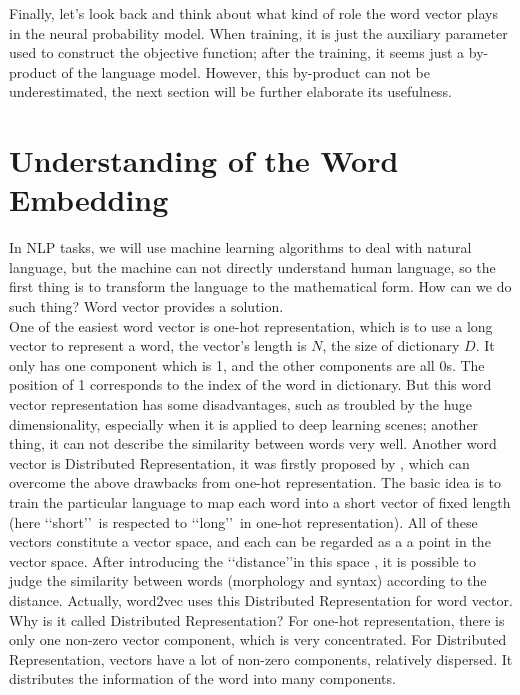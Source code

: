 Finally, let's look back and think about what kind of role the word vector plays in the neural probability model. When training, it is just the auxiliary parameter used to construct the objective function; after the training, it seems just a by-product of the language model. However, this by-product can not be underestimated, the next section will be further elaborate its usefulness.
\section{Understanding of the Word Embedding}
In NLP tasks, we will use machine learning algorithms to deal with natural language, but the machine can not directly understand human language, so the first thing is to transform the language to the mathematical form. How can we do such thing? Word vector provides a solution.\\

One of the easiest word vector is one-hot representation, which is to use a long vector to represent a word, the vector's length is  $N$, the size of dictionary $D$. It only has one component which is 1, and the other components are all 0s. The position of 1 corresponds to the index of the word in dictionary. But this word vector representation has some disadvantages, such as troubled by the huge dimensionality, especially when it is applied to deep learning scenes; another thing, it can not describe the similarity between words very well. Another word vector is Distributed Representation, it was firstly proposed by \cite{williams1986learning}, which can overcome the above drawbacks from one-hot representation. The basic idea is to train the particular language to map each word into a short vector of fixed length (here \lq\lq short\rq\rq\ is respected to \lq\lq long\rq\rq\ in one-hot representation). All of these vectors constitute a vector space, and each can be regarded as a a point in the vector space. After introducing the \lq\lq distance\rq\rq in this space , it is possible to judge the similarity between words (morphology and syntax) according to the distance. Actually, word2vec uses this Distributed Representation for word vector.\\

Why is it called Distributed Representation? For one-hot representation, there is only one non-zero vector component, which is very concentrated. For Distributed Representation, vectors have a lot of non-zero components, relatively dispersed. It distributes the information of the word into many components.

